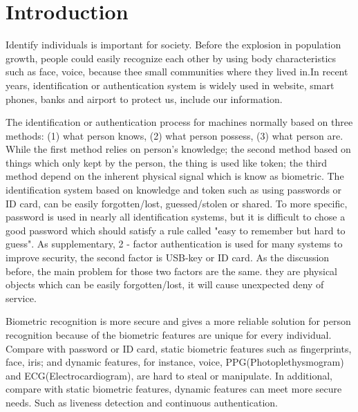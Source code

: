 \documentclass[a4paper,12pt]{article}
\begin{document}

\clearpage
\tableofcontents\label{c}

\clearpage
\section{Introduction}\label{Introduction}
Identify individuals is important for society. Before the explosion in population growth, people could easily recognize each other by using body characteristics such as face, voice, because thee small communities where they lived in\parencite{Jain:2011bio}.In recent years, identification or authentication system is widely used in website, smart phones, banks and airport to protect us, include our information\parencite{Pinto:2018evolution}. 

The identification or authentication process for machines normally based on three methods: (1) what person knows, (2) what person possess, (3) what person are. While the first method relies on person's knowledge; the second method based on things which only kept by the person, the thing is used like token; the third method depend on the inherent physical signal which is know as biometric. The identification system based on knowledge and token such as using passwords or ID card, can be easily forgotten/lost, guessed/stolen or shared\parencite{Jain:2011bio}. To more specific, password is used in nearly all identification systems, but it is difficult to chose a good password which should satisfy a rule called "easy to remember but hard to guess". As supplementary, 2 - factor authentication is used for many systems to improve security, the second factor is USB-key or ID card. As the discussion before, the main problem for those two factors are the same. they are physical objects which can be easily forgotten/lost, it will cause unexpected deny of service\parencite{Blasco:2018feasibility}.

Biometric recognition is more secure and gives a more reliable solution for person recognition because of the biometric features are unique for every individual\parencite{Jain:2011bio}. Compare with password or ID card, static biometric features such as fingerprints, face, iris; and dynamic features, for instance, voice, PPG(Photoplethysmogram) and ECG(Electrocardiogram), are hard to steal or manipulate\parencite{Agrafioti:2011heart}. In additional, compare with static biometric features, dynamic features can meet more secure needs. Such as liveness detection and continuous authentication\parencite{Agrafioti:2011medical}.
\end{document}
